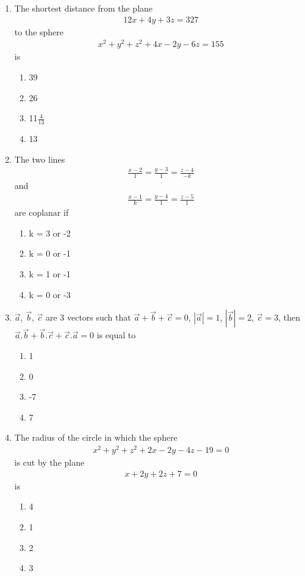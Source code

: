 \begin{enumerate}[label=\arabic*.,ref=\thesubsection.\theenumi]
\item The shortest distance from the plane 
\begin{align}
12x+4y+3z=327
\end{align}
to the sphere
\begin{align}
x^{2}+y^{2}+z^{2}+4x-2y-6z=155
\end{align}
is
\begin{enumerate}
\item 39
\item 26
\item 11$\frac{4}{13}$
\item 13
\end{enumerate}

\item The two lines 
\begin{align*}
\frac{x-2}{1} = \frac{y-3}{1} = \frac{z-4}{-k}
\end{align*}
and 
\begin{align*}
\frac{x-1}{k} = \frac{y-4}{1} = \frac{z-5}{1}
\end{align*}
are coplanar if
\begin{enumerate}
\item k = 3 or -2
\item k = 0 or -1
\item k = 1 or -1
\item k = 0 or -3
\end{enumerate}

\item $\overrightarrow{a}$, $\overrightarrow{b}$, $\overrightarrow{c}$ are 3 vectors such that 
$\overrightarrow{a}+\overrightarrow{b}+\overrightarrow{c}=0$, $|\overrightarrow{a}|=1$, $|\overrightarrow{b}|=2$, $\overrightarrow{c}=3$, then $\overrightarrow{a}.\overrightarrow{b}+\overrightarrow{b}.\overrightarrow{c}+\overrightarrow{c}.\overrightarrow{a}=0$ is equal to
\begin{enumerate}
\item 1
\item 0
\item -7
\item 7
\end{enumerate}

\item The radius of the circle in which the sphere
\begin{align}
x^2+y^2+z^2+2x-2y-4z-19=0 
\end{align}
is cut by the plane
\begin{align}
x+2y+2z+7=0
\end{align}
is
\begin{enumerate}
\item 4
\item 1
\item 2
\item 3
\end{enumerate}


\end{enumerate}
